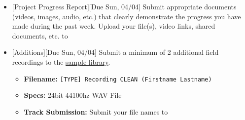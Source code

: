 \def\dMon{Mon, 03/29}
\def\dTues{Tues, 03/30}
\def\dWed{Wed, 03/31}
\def\dThur{Thur, 04/01}
\def\dFri{Fri, 04/02}
\def\dSat{Sat, 04/03}
\def\dSun{Sun, 04/04}
\placeDate

\begin{itemize}[noitemsep,topsep=0pt,leftmargin=*]
    \item {}[Project Progress Report][Due \dSun] \newline
          Submit appropriate documents (videos, images, audio, etc.) that clearly demonstrate the progress you have made during the past week. Upload your file(s), video links, shared documents, etc. to \discordE
    \item {}[Additions][Due \dSun] \newline
          Submit a minimum of 2 additional field recordings to the \href{\samplelibPermURL}{sample library}.
          \begin{itemize}
              \item \textbf{Filename:} \texttt{[TYPE] Recording CLEAN (Firstname Lastname)}
              \item \textbf{Specs:} 24bit 44100hz WAV File
              \item \textbf{Track Submission:} Submit your file names to \discordS
          \end{itemize}
\end{itemize}